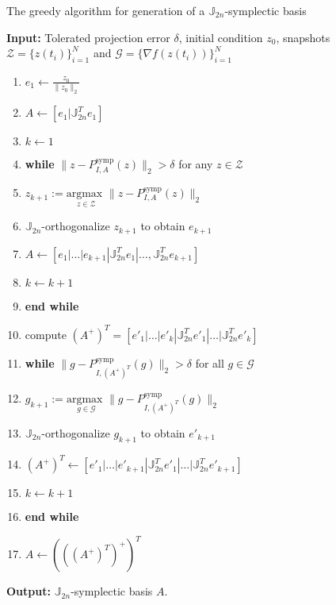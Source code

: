 \begin{algorithm} 
\caption{The greedy algorithm for generation of a $\mathbb J_{2n}$-symplectic basis} \label{alg:1}
{\bf Input:} Tolerated projection error $\delta$, initial condition $ z_0$, snapshots $\mathcal Z = \{ z(t_i) \}_{i=1}^{N}$ and $\mathcal G = \{ \nabla f(z(t_i)) \}_{i=1}^{N}$
\begin{enumerate}
\item $e_1 \leftarrow \frac{z_0}{\|z_0\|_2}$
\item $A \leftarrow [e_1|\mathbb J^T_{2n}e_1]$
\item $k \leftarrow 1$
\item \textbf{while} $\| z - P^\text{symp}_{I,A}( z ) \|_2 > \delta$ for any $z\in \mathcal Z$
\item \hspace{0.5cm} $z_{k+1} := \underset{z\in \mathcal Z}{\text{argmax }} \| z - P^\text{symp}_{I,A}( z ) \|_2$
\item \hspace{0.5cm} $\mathbb J_{2n}$-orthogonalize $ z_{k+1}$ to obtain $e_{k+1}$
\item \hspace{0.5cm} $A \leftarrow [e_1|\dots |e_{k+1} | \mathbb J^T_{2n}e_1|\dots,\mathbb J^T_{2n}e_{k+1}]$
\item \hspace{0.5cm} $k \leftarrow k+1$
\item \textbf{end while}
\item compute $(A^+)^T=[e'_1|\dots|e'_k|\mathbb J^T_{2n}e'_1|\dots|\mathbb J^T_{2n}e'_k]$
\item \textbf{while} $\| g - P^\text{symp}_{I,(A^+)^T}(g) \|_2 > \delta$ for all $g \in \mathcal G$
\item \hspace{0.5cm} $g_{k+1} := \underset{g \in \mathcal G}{\text{argmax }} \| g - P^\text{symp}_{I,(A^+)^T}(g) \|_2$
\item \hspace{0.5cm} $\mathbb J_{2n}$-orthogonalize $g_{k+1}$ to obtain $e'_{k+1}$
\item \hspace{0.5cm} $(A^+)^T \leftarrow [e'_1|\dots |e'_{k+1} | \mathbb J^T_{2n}e'_1|\dots|\mathbb J^T_{2n}e'_{k+1}]$
\item \hspace{0.5cm} $k \leftarrow k+1$
\item \textbf{end while}
\item $A \leftarrow \left( \left( \left( A^+\right) ^T \right ) ^+ \right)^T$
\end{enumerate}
\vspace{0.5cm}
{\bf Output:} $\mathbb J_{2n}$-symplectic basis $A$.
\end{algorithm}
